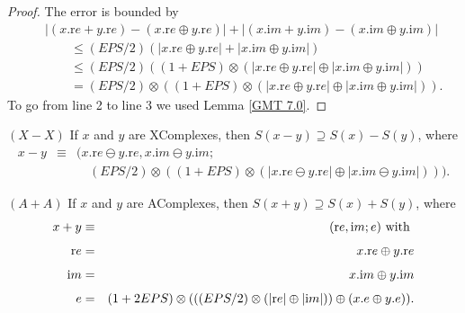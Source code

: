 \begin{proof}{}
The error is bounded by
\begin{eqnarray*}
&&|(x.{\mathrm re} + y.{\mathrm re}) - (x.{\mathrm re} \oplus y.{\mathrm re})| + 
  |(x.{\mathrm im} + y.{\mathrm im}) - (x.{\mathrm im} \oplus y.{\mathrm im})|\\[4pt]
&&\qquad \le (EPS/2)(| x.{\mathrm re} \oplus y.{\mathrm re}| + 
   |x.{\mathrm im} \oplus y.{\mathrm im}|)\\[4pt]
&&\qquad \le (EPS/2)((1 + EPS) \otimes (| x.{\mathrm re} \oplus y.{\mathrm re}| \oplus 
   |x.{\mathrm im} \oplus y.{\mathrm im}|))\\[4pt]
&&\qquad = (EPS/2) \otimes ((1 + EPS) \otimes (| x.{\mathrm re} \oplus y.{\mathrm re}| \oplus 
   |x.{\mathrm im} \oplus y.{\mathrm im}|)).
\end{eqnarray*}
To go from line 2 to line 3 we used Lemma \ref{GMT 7.0}. \end{proof}

\begin{proposition}\label{GMT 7.5}{$(X - X)$}
If $x$ and $y$ are {\textrm XComplexes,} then 
$S(x - y) \supseteq S(x) - S(y)${\textrm ,} where
\begin{eqnarray*}
x - y &\equiv& (x.{\mathrm re} \ominus y.{\mathrm re}, x.{\mathrm im} \ominus y.{\mathrm im};\\[4pt]
&&\quad 
(EPS/2)\otimes ((1 + EPS) \otimes (|x.{\mathrm re} \ominus y.{\mathrm re}| \oplus |x.{\mathrm im} \ominus y.{\mathrm im}|))).
\end{eqnarray*} \end{proposition}


\begin{proposition}\label{GMT 7.6}{$(A + A)$} 
If $x$ and $y$ are {\textrm AComplexes,} then 
$S(x + y) \supseteq S(x) + S(y)${\textrm ,} where
\begin{eqnarray*}
 x+y &\equiv& ({\mathrm re},{\mathrm im};e) \hbox{ with }\\[4pt]
{\mathrm re}& =& x.{\mathrm re} \oplus y.{\mathrm re}\\[4pt]
{\mathrm im}& =& x.{\mathrm im} \oplus y.{\mathrm im}\\[4pt]
e& =& (1 + 2 EPS) \otimes ( ((EPS/2) \otimes (|{\mathrm re}| \oplus |{\mathrm im}|))
 \oplus (x.e \oplus y.e)). \end{eqnarray*}
\end{proposition}

